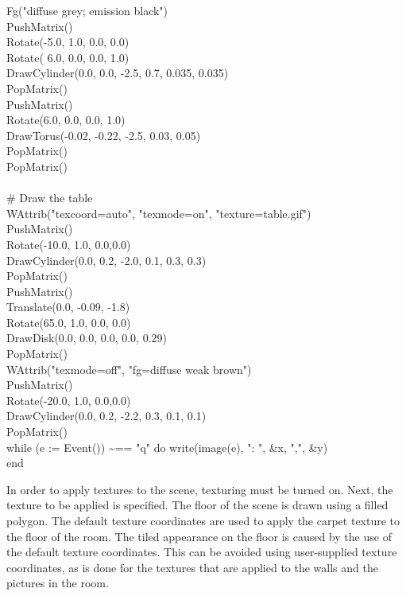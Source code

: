 {\>   Fg("diffuse grey; emission black") \\
\>   PushMatrix() \\
\>   Rotate(-5.0, 1.0, 0.0, 0.0) \\
\>   Rotate( 6.0, 0.0, 0.0, 1.0) \\
\>   DrawCylinder(0.0, 0.0, -2.5, 0.7, 0.035, 0.035) \\
\>   PopMatrix() \\
\>   PushMatrix() \\
\>   Rotate(6.0, 0.0, 0.0, 1.0) \\
\>   DrawTorus(-0.02, -0.22, -2.5, 0.03, 0.05) \\
\>   PopMatrix()  \\
\>   PopMatrix() \\
\ \\
\>   \# Draw the table  \\
\>   WAttrib("texcoord=auto", "texmode=on", "texture=table.gif") \\
\>   PushMatrix() \\
\>   Rotate(-10.0, 1.0, 0.0,0.0) \\
\>   DrawCylinder(0.0, 0.2, -2.0, 0.1, 0.3, 0.3) \\
\>   PopMatrix() \\
\>   PushMatrix() \\
\>   Translate(0.0, -0.09, -1.8) \\
\>   Rotate(65.0, 1.0, 0.0, 0.0) \\
\>   DrawDisk(0.0, 0.0, 0.0, 0.0, 0.29)  \\
\>   PopMatrix() \\
\>   WAttrib("texmode=off", "fg=diffuse weak brown") \\
\>   PushMatrix() \\
\>   Rotate(-20.0, 1.0, 0.0,0.0) \\
\>   DrawCylinder(0.0, 0.2, -2.2, 0.3, 0.1, 0.1) \\
\>   PopMatrix() \\
\>   while (e := Event()) \~{}== "q" do
        write(image(e), ": ", \&x, ",", \&y) \\
end
}

In order to apply textures to the scene, texturing must be turned
on. Next, the texture to be applied is specified. The floor of the
scene is drawn using a filled polygon. The default texture coordinates
are used to apply the carpet texture to the floor of the room. The
tiled appearance on the floor is caused by the use of the default
texture coordinates. This can be avoided using user-supplied texture
coordinates, as is done for the textures that are applied to the walls
and the pictures in the room.

